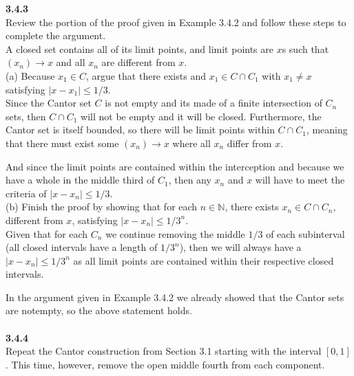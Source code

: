 \label{abbott:3.4.3}
\textbf{3.4.3}
\\

Review the portion of the proof given in Example 3.4.2 and follow these steps to complete the argument.
\\

A closed set contains all of its limit points, and limit points are $x$s such that
$(x_n) \rightarrow x$ and all $x_n$ are different from $x$.
\\

(a) Because $x_1 \in C$, argue that there exists and $x_1 \in C \cap C_1$ with $x_1 \neq x$
satisfying $|x - x_1| \leq 1/3$.
\\

Since the Cantor set $C$ is not empty and its made of a finite intersection of $C_n$ sets,
then $C \cap C_1$ will not be empty and it will be closed.
Furthermore, the Cantor set is itself bounded, so there will be limit points within $C \cap C_1$,
meaning that there must exist some $(x_n) \rightarrow x$ where all $x_n$ differ from $x$.

And since the limit points are contained within the interception and because we have a whole in the middle
third of $C_1$, then any $x_n$ and $x$ will have to meet the criteria of $|x - x_n| \leq 1/3$.
\\

(b) Finish the proof by showing that for each $n\in\mathbb{N}$, there exists $x_n \in C \cap C_n$,
different from $x$, satisfying $|x - x_n| \leq 1/3^n$.
\\

Given that for each $C_n$ we continue removing the middle $1/3$ of each subinterval (all closed intervals have
a length of $1/3^n$),
then we will always have a $|x - x_n| \leq 1/3^n$ as all limit points are contained within their respective
closed intervals.

In the argument given in Example 3.4.2 we already showed that the Cantor sets are notempty, so the above statement holds.
\\~\\



\label{abbott:3.4.4}
\textbf{3.4.4}
\\

Repeat the Cantor construction from Section 3.1 starting with the interval $[0,1]$.
This time, however, remove the open middle fourth from each component.
\\


